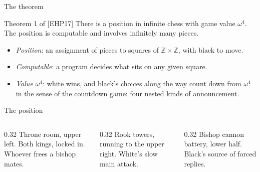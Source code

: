 \documentclass[aspectratio=169,10pt]{beamer}
\newcommand{\EHP}{[EHP17]}
\begin{document}

\begin{frame}{The theorem}
  \begin{block}{Theorem 1 of \EHP}
    There is a position in infinite chess with game value $\omega^4$. The position is computable and involves
    infinitely many pieces.
  \end{block}
  \vskip 0.3cm
  \begin{itemize}
    \item \emph{Position}: an assignment of pieces to squares of $\mathbb{Z}\times\mathbb{Z}$, with black to move.
    \item \emph{Computable}: a program decides what sits on any given square.
    \item \emph{Value $\omega^4$}: white wins, and black's choices along the way count down from $\omega^4$ in the
      sense of the countdown game: four nested kinds of announcement.
  \end{itemize}
\end{frame}

\begin{frame}{The position}
  \credit{Figure 1 of \EHP.}
  \begin{columns}[T]
    \begin{column}{0.32\textwidth}
      Throne room, upper left. Both kings, locked in. Whoever frees a bishop mates.
    \end{column}
    \begin{column}{0.32\textwidth}
      Rook towers, running to the upper right. White's slow main attack.
    \end{column}
    \begin{column}{0.32\textwidth}
      Bishop cannon battery, lower half. Black's source of forced replies.
    \end{column}
  \end{columns}
\end{frame}
\end{document}
